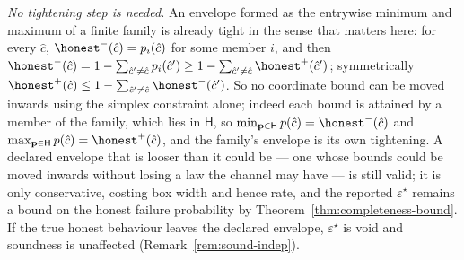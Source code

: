 \begin{remark}
\emph{No tightening step is needed.} An envelope formed as the entrywise
minimum and maximum of a finite family is already tight in the sense that
matters here: for every $\hat c$, ${\honest}^{-}(\hat c)=p_i(\hat c)$ for some
member $i$, and then
${\honest}^{-}(\hat c)=1-\sum_{\hat c'\neq\hat c}p_i(\hat c')\ge
1-\sum_{\hat c'\neq\hat c}{\honest}^{+}(\hat c')$; symmetrically
${\honest}^{+}(\hat c)\le1-\sum_{\hat c'\neq\hat c}{\honest}^{-}(\hat c')$.
So no coordinate bound can be moved inwards using the simplex constraint
alone; indeed each bound is attained by a member of the family, which lies in
$\mathsf{H}$, so $\min_{\mathbf{p}\in\mathsf{H}}p(\hat c)={\honest}^{-}(\hat c)$
and $\max_{\mathbf{p}\in\mathsf{H}}p(\hat c)={\honest}^{+}(\hat c)$, and the
family's envelope is its own tightening. A declared envelope that is looser
than it could be --- one whose bounds could be moved inwards without losing a
law the channel may have --- is still valid; it is only conservative, costing
box width and hence rate, and the reported $\varepsilon^{\star}$ remains a
bound on the honest failure probability by Theorem~\ref{thm:completeness-bound}. If the true
honest behaviour leaves the declared envelope, $\varepsilon^{\star}$ is void
and soundness is unaffected (Remark~\ref{rem:sound-indep}).
\end{remark}

